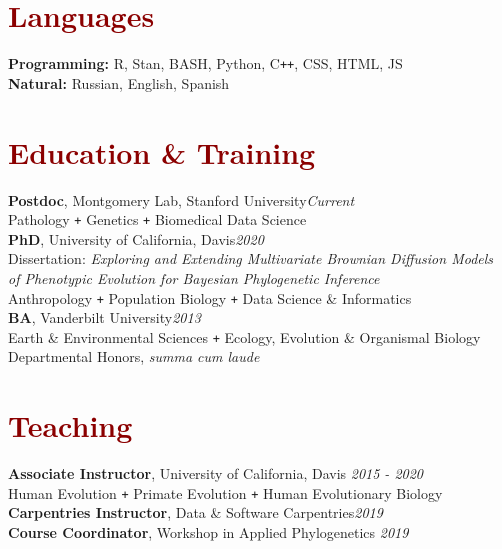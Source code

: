 \documentclass[11pt,margin,line]{resume}
\begin{document}
\begin{resume}
\vspace{-5mm}
\section{\large\textcolor{DarkRed}{Languages}}
\textbf{Programming:} R, Stan, BASH, Python, C\texttt{\texttt{+}\texttt{+}}, CSS, HTML, JS\\
\textbf{Natural:} Russian, English, Spanish


\vspace{-1.5mm}
\section{\large\textcolor{DarkRed}{Education  \& Training}}

\textbf{Postdoc}, Montgomery Lab, Stanford University\hfill\emph{Current}\\
Pathology \texttt{+} Genetics \texttt{+} Biomedical Data Science
\vspace{-1em}\\

\textbf{PhD}, University of California, Davis\hfill\emph{2020}\\
Dissertation: \textit{Exploring and Extending Multivariate Brownian Diffusion Models\\\hspace*{22mm} of Phenotypic Evolution for Bayesian Phylogenetic Inference}\\
Anthropology \texttt{+} Population Biology \texttt{+} Data Science \& Informatics
\vspace{-1em}\\

\textbf{BA}, Vanderbilt University\hfill\emph{2013}\\
Earth \& Environmental Sciences \texttt{+} Ecology, Evolution \& Organismal Biology\\
Departmental Honors, \textit{summa cum laude}\\
\vspace{-1.5em}

\vspace{-1.5mm}
\section{\large\textcolor{DarkRed}{Teaching}}
\textbf{Associate Instructor}, University of California, Davis \hfill \emph{2015  - 2020}
\\Human Evolution \texttt{+} Primate Evolution \texttt{+} Human Evolutionary Biology
\\\textbf{Carpentries Instructor}, Data \& Software Carpentries\hfill \emph{2019}
\\\textbf{Course Coordinator}, Workshop in Applied Phylogenetics \hfill \emph{2019}


\end{resume}
\end{document}
